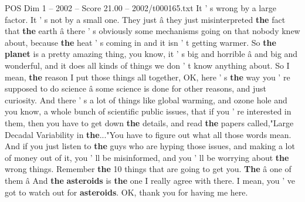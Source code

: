 \begin{textsample}{POS Dim 1 – 2002 – Score 21.00 – 2002/t000165.txt}
It ' s wrong by a large factor.
It ' s not by a small one.
They just â they just misinterpreted \textbf{the} fact that \textbf{the} earth â there ' s obviously some mechanisms going on that nobody knew about, because \textbf{the} heat ' s coming in and it isn ' t getting warmer.
So \textbf{the} \textbf{planet} is a pretty amazing thing, you know, it ' s big and horrible â and big and wonderful, and it does all kinds of things we don ' t know anything about.
So I mean, \textbf{the} reason I put those things all together, OK, here ' s \textbf{the} way you ' re supposed to do science â some science is done for other reasons, and just curiosity.
And there ' s a lot of things like global warming, and ozone hole and you know, a whole bunch of scientific public issues, that if you ' re interested in them, then you have to get down \textbf{the} details, and read \textbf{the} papers called,"Large Decadal Variability in \textbf{the}..."You have to figure out what all those words mean.
And if you just listen to \textbf{the} guys who are hyping those issues, and making a lot of money out of it, you ' ll be misinformed, and you ' ll be worrying about \textbf{the} wrong things.
Remember \textbf{the} 10 things that are going to get you. \textbf{The} â one of them â And \textbf{the} \textbf{asteroids} is \textbf{the} one I really agree with there.
I mean, you ' ve got to watch out for \textbf{asteroids}.
OK, thank you for having me here.

\end{textsample}

